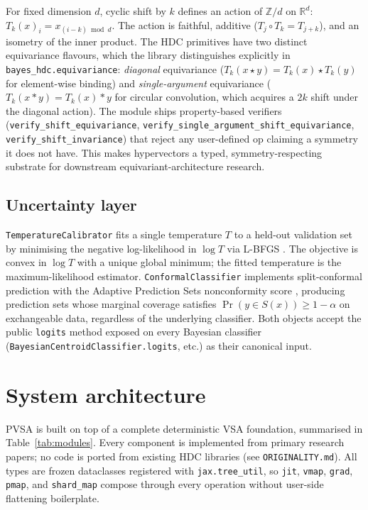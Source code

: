 \documentclass[twoside,11pt]{article}
\begin{document}
For fixed dimension $d$, cyclic shift by $k$ defines an action of $\mathbb{Z}/d$ on $\mathbb{R}^d$: $T_k(x)_i = x_{(i-k) \bmod d}$. The action is faithful, additive ($T_j \circ T_k = T_{j+k}$), and an isometry of the inner product. The HDC primitives have two distinct equivariance flavours, which the library distinguishes explicitly in \texttt{bayes\_hdc.equivariance}: \emph{diagonal} equivariance ($T_k(x \star y) = T_k(x) \star T_k(y)$ for element-wise binding) and \emph{single-argument} equivariance ($T_k(x * y) = T_k(x) * y$ for circular convolution, which acquires a $2k$ shift under the diagonal action). The module ships property-based verifiers (\texttt{verify\_shift\_equivariance}, \texttt{verify\_single\_argument\_shift\_equivariance}, \texttt{verify\_shift\_invariance}) that reject any user-defined op claiming a symmetry it does not have. This makes hypervectors a typed, symmetry-respecting substrate for downstream equivariant-architecture research.

\subsection{Uncertainty layer}

\texttt{TemperatureCalibrator} fits a single temperature $T$ to a held-out validation set by minimising the negative log-likelihood in $\log T$ via L-BFGS \citep{guo2017calibration}. The objective is convex in $\log T$ with a unique global minimum; the fitted temperature is the maximum-likelihood estimator. \texttt{ConformalClassifier} implements split-conformal prediction with the Adaptive Prediction Sets nonconformity score \citep{romano2020classification}, producing prediction sets whose marginal coverage satisfies $\Pr(y \in S(x)) \geq 1 - \alpha$ on exchangeable data, regardless of the underlying classifier. Both objects accept the public \texttt{logits} method exposed on every Bayesian classifier (\texttt{BayesianCentroidClassifier.logits}, etc.) as their canonical input.

\section{System architecture}
\label{sec:system}

PVSA is built on top of a complete deterministic VSA foundation, summarised in Table~\ref{tab:modules}. Every component is implemented from primary research papers; no code is ported from existing HDC libraries (see \texttt{ORIGINALITY.md}). All types are frozen dataclasses registered with \texttt{jax.tree\_util}, so \texttt{jit}, \texttt{vmap}, \texttt{grad}, \texttt{pmap}, and \texttt{shard\_map} compose through every operation without user-side flattening boilerplate.
\end{document}
